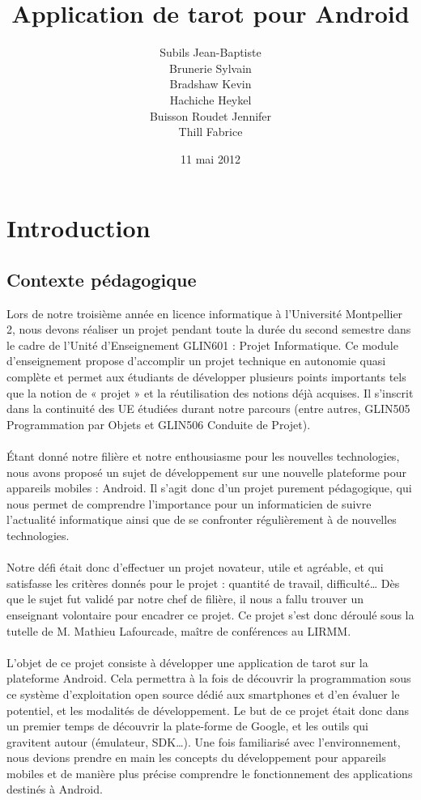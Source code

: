 \documentclass[a4paper]{report}
\title{\huge{Application de tarot pour Android}}
\author{Subils Jean-Baptiste\\
Brunerie Sylvain\\
Bradshaw Kevin\\
Hachiche Heykel\\ 
Buisson Roudet Jennifer\\ 
Thill Fabrice}
\date{11 mai 2012}
\begin{document}
\maketitle


\tableofcontents





\chapter{Introduction}
	\section{Contexte pédagogique}
		Lors de notre troisième année en licence informatique à l’Université Montpellier 2, nous devons réaliser un projet pendant toute la durée du second semestre dans le cadre de l’Unité 			d’Enseignement GLIN601 : Projet Informatique. Ce module d’enseignement propose d’accomplir un projet technique en autonomie quasi complète et permet aux étudiants de développer 			plusieurs points importants tels que la notion de « projet » et la réutilisation des notions déjà acquises. Il s’inscrit dans la continuité des UE étudiées durant notre parcours 			(entre autres, GLIN505 Programmation par Objets et GLIN506 Conduite de Projet).\\
		\\ 

		Étant donné notre filière et notre enthousiasme pour les nouvelles technologies, nous avons proposé un sujet de développement sur une nouvelle plateforme pour appareils mobiles : Android. Il 			s’agit donc d’un projet purement pédagogique, qui nous permet de comprendre l’importance pour un informaticien de suivre l’actualité informatique ainsi que de se confronter 			régulièrement à de nouvelles technologies.\\
		\\ 
		Notre défi était donc d’effectuer un projet novateur, utile et agréable, et qui satisfasse les critères donnés pour le projet : quantité de travail, difficulté… Dès que le sujet fut 			validé par notre chef de filière, il nous a fallu trouver un enseignant volontaire pour encadrer ce projet. Ce projet s’est donc déroulé sous la tutelle de M. Mathieu Lafourcade, maître 			de conférences au LIRMM.\\
		\\  
		L’objet de ce projet consiste à développer une application de tarot sur la plateforme Android. Cela permettra à la fois de découvrir la programmation sous ce système d’exploitation open 			source dédié aux smartphones et d’en évaluer le potentiel, et les modalités de développement. Le but de ce projet était donc dans un premier temps de découvrir la plate-forme de Google, et les outils qui gravitent 			autour (émulateur, SDK…). Une fois familiarisé avec l’environnement, nous devions prendre en main les concepts du développement pour appareils mobiles et de manière plus précise 			comprendre le fonctionnement des applications destinés à Android.\\
\end{document}
